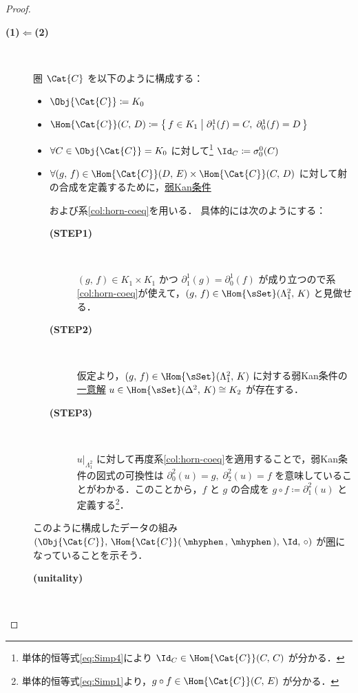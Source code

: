 \documentclass[TQFT_main]{subfiles}
\begin{document}
\begin{proof}
\begin{description}
        \item[\textbf{(1)$\bm{\Longleftarrow}$(2)}]　
        
        圏 $\Cat{C}$ を以下のように構成する：
        \begin{itemize}
            \item $\Obj{\Cat{C}} \coloneqq K_0$ 
            \item $\Hom{\Cat{C}}(C,\, D) \coloneqq \bigl\{\, f \in K_1 \bigm| \partial^1_1(f) = C,\; \partial^1_0(f) = D \,\bigr\}$
            \item $\forall C \in \Obj{\Cat{C}} = K_0$ に対して\footnote{単体的恒等式\eqref{eq:Simp4}により $\Id_C \in \Hom{\Cat{C}}(C,\, C)$ が分かる．} $\Id_C \coloneqq \sigma^0_0(C)$
            \item $\forall (g,\, f) \in \Hom{\Cat{C}}(D,\, E) \times \Hom{\Cat{C}}(C,\, D)$ に対して射の合成を定義するために，\hyperref[def:KanCplx]{弱Kan条件}
            \begin{center}
            \end{center}
            および系\ref{col:horn-coeq}を用いる．
            具体的には次のようにする：
            \begin{description}
                \item[\textbf{(STEP1)}]　 
                
                $(g,\, f) \in K_1 \times K_1$ かつ $\partial^1_1(g) = \partial^1_{0}(f)$ が成り立つので系\ref{col:horn-coeq}が使えて，$(g,\, f) \in \Hom{\sSet}(\Lambda^2_1,\, K)$ と見做せる．
                \item[\textbf{(STEP2)}]　 
                
                仮定より，$(g,\, f) \in \Hom{\sSet}(\Lambda^2_1,\, K)$ に対する弱Kan条件の\underline{一意解} $u \in \Hom{\sSet}(\Delta^2,\, K) \cong K_2$ が存在する．
                \item[\textbf{(STEP3)}]　 
                
                $u|_{\Lambda^2_1}$ に対して再度系\ref{col:horn-coeq}を適用することで，弱Kan条件の図式の可換性は $\partial^2_0(u) = g,\; \partial^2_2(u) = f$ を意味していることがわかる．このことから，$f$ と $g$ の合成を $g \circ f \coloneqq \partial^2_1(u)$ と定義する\footnote{単体的恒等式\eqref{eq:Simp1}より，$g \circ f \in \Hom{\Cat{C}}(C,\, E)$ が分かる．}．
            \end{description}
        \end{itemize}
        このように構成したデータの組み $(\Obj{\Cat{C}},\, \Hom{\Cat{C}}(\, \mhyphen\,,\,\mhyphen \,),\, \Id,\, \circ)$ が\hyperref[def:category]{圏}になっていることを示そう．
        \begin{description}
            \item[\textbf{(unitality)}]　
            

\end{description}
\end{description}
\end{proof}
\end{document}
